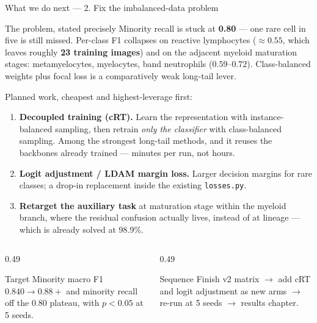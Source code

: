 \documentclass[aspectratio=169,11pt]{beamer}
\begin{document}
\begin{frame}{What we do next --- 2. Fix the imbalanced-data problem}
  \footnotesize
  \begin{alertblock}{The problem, stated precisely}
    \scriptsize
    Minority recall is stuck at \textbf{0.80} --- one rare cell in five is still
    missed. Per-class F1 collapses on reactive lymphocytes ($\approx 0.55$,
    which leaves roughly \textbf{23 training images}) and on the adjacent
    myeloid maturation stages: metamyelocytes, myelocytes, band neutrophils
    ($0.59$--$0.72$). Class-balanced weights plus focal loss is a comparatively
    weak long-tail lever.
  \end{alertblock}

  \vspace{0.2em}
  Planned work, cheapest and highest-leverage first:
  \begin{enumerate}\setlength{\itemsep}{0.2em}
    \item \textbf{Decoupled training (cRT).} Learn the representation with
      instance-balanced sampling, then retrain \emph{only the classifier} with
      class-balanced sampling. Among the strongest long-tail methods, and it
      reuses the backbones already trained --- minutes per run, not hours.
    \item \textbf{Logit adjustment / LDAM margin loss.} Larger decision margins
      for rare classes; a drop-in replacement inside the existing
      \texttt{losses.py}.
    \item \textbf{Retarget the auxiliary task} at maturation stage within the
      myeloid branch, where the residual confusion actually lives, instead of at
      lineage --- which is already solved at 98.9\%.
  \end{enumerate}

  \vspace{0.3em}
  \begin{columns}[T]
    \begin{column}{0.49\textwidth}
      \begin{exampleblock}{Target}
        \scriptsize
        Minority macro F1 $0.840 \rightarrow 0.88+$ and minority recall off the
        $0.80$ plateau, with $p < 0.05$ at 5 seeds.
      \end{exampleblock}
    \end{column}
    \begin{column}{0.49\textwidth}
      \begin{block}{Sequence}
        \scriptsize
        Finish v2 matrix $\rightarrow$ add cRT and logit adjustment as new arms
        $\rightarrow$ re-run at 5 seeds $\rightarrow$ results chapter.
      \end{block}
    \end{column}
  \end{columns}
\end{frame}
\end{document}
